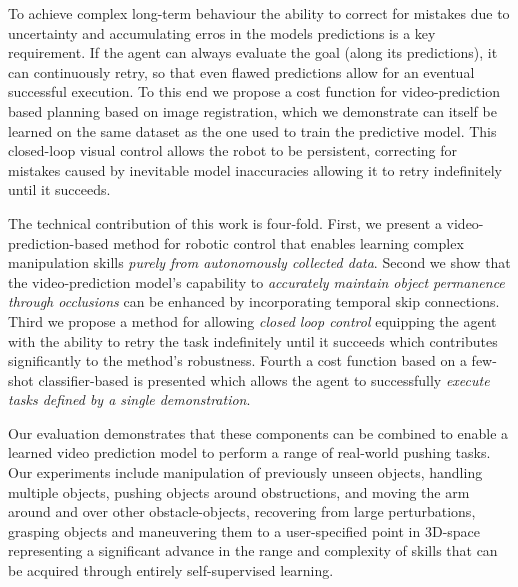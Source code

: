 
To achieve complex long-term behaviour the ability to correct for mistakes due to uncertainty and accumulating erros in the models predictions is a key requirement. If the agent can always evaluate the goal (along its predictions), it can continuously retry, so that even flawed predictions allow for an eventual successful execution. To this end we propose a cost function for video-prediction based planning based on image registration, which we demonstrate can itself be learned on the same dataset as the one used to train the predictive model. This closed-loop visual control allows the robot to be persistent, correcting for mistakes caused by inevitable model inaccuracies allowing it to retry indefinitely until it succeeds.


The technical contribution of this work is four-fold. First, we present a video-prediction-based method for robotic control that enables learning complex manipulation skills \emph{purely from autonomously collected data}. Second we show that the video-prediction model's capability to \emph{accurately maintain object permanence through occlusions} can be enhanced by incorporating temporal skip connections. Third we propose a method for allowing \emph{closed loop control} equipping the agent with the ability to retry the task indefinitely until it succeeds which contributes significantly to the method's robustness. Fourth a cost function based on a few-shot classifier-based is presented which allows the agent to successfully \emph{execute tasks defined by a single demonstration}.

Our evaluation demonstrates that these components can be combined to enable a learned video prediction model to perform a range of real-world pushing tasks. Our experiments include manipulation of previously unseen objects, handling multiple objects, pushing objects around obstructions, and moving the arm around and over other obstacle-objects, recovering from large perturbations, grasping objects and maneuvering them to a user-specified point in 3D-space representing a significant advance in the range and complexity of skills that can be acquired through entirely self-supervised learning.

 





